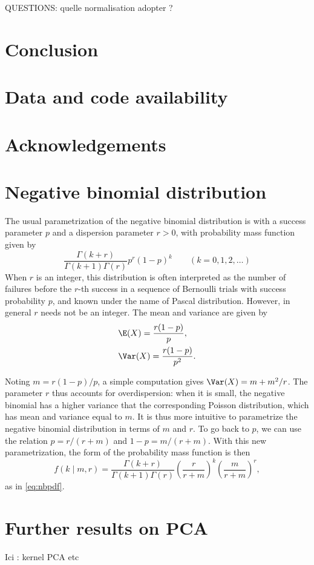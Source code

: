 \documentclass[11pt,a4paper]{article}
\begin{document}
QUESTIONS: quelle normalisation adopter ?

\section{Conclusion}
\label{sec:conclusion}


\section*{Data and code availability}



\section*{Acknowledgements}






\newpage 
\appendix

  \section{Negative binomial distribution}
  \label{sec:nb}

  The usual parametrization of the negative binomial distribution is with a success parameter $p$ and a dispersion parameter $r>0$, with probability mass function given by 
  \begin{equation}
    \frac{\Gamma(k + r)}{\Gamma(k + 1) \Gamma(r)} p^r (1 - p)^k \qquad (k=0,1,2,\dots)
  \end{equation}
  When $r$ is an integer, this distribution is often interpreted as the number of failures before the $r$-th success in a sequence of Bernoulli trials with success probability $p$, and known under the name of Pascal distribution. However, in general $r$ needs not be an integer. The mean and variance are given by
  \begin{align}
    &\E(X) = \frac{r(1 - p)}{p}, \\
    &\Var(X) = \frac{r(1 - p)}{p^2}.
  \end{align}

  Noting $m = r(1 - p)/p$, a simple computation gives $\Var(X) = m + m^2 / r$. The parameter $r$ thus accounts for overdispersion: when it is small, the negative binomial has a higher variance that the corresponding Poisson distribution, which has mean and variance equal to $m$. It is thus more intuitive to parametrize the negative binomial distribution in terms of $m$ and $r$. To go back to $p$, we can use the relation $p = r/(r + m)$ and $1-p = m/(r + m)$. With this new parametrization, the form of the probability mass function is then
  \begin{equation}
    f(k \mid m, r) = \frac{\Gamma(k + r)}{\Gamma(k + 1) \Gamma(r)} \left(\frac{r}{r + m}\right)^k \left(\frac{m}{r + m}\right)^r,
  \end{equation}
  as in \eqref{eq:nbpdf}. 

  \section{Further results on PCA}\label{sec:pca}

  Ici : kernel PCA etc
\end{document}
